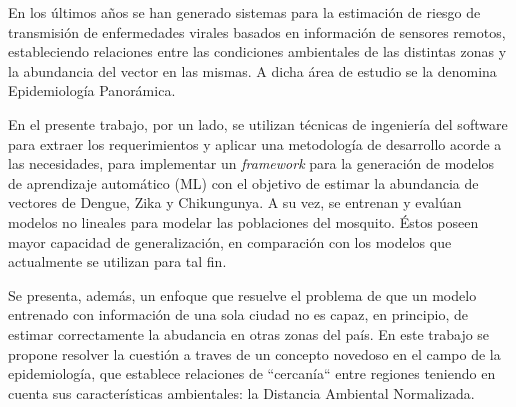   \par En los últimos años se han generado sistemas para la estimación de riesgo de transmisión
    de enfermedades virales basados en información de sensores remotos,
    estableciendo relaciones entre las condiciones ambientales de las distintas
    zonas y la abundancia del vector en las mismas. A dicha área de estudio
    se la denomina Epidemiología Panorámica.

 \par En el presente trabajo, por un lado, se utilizan técnicas de
    ingeniería del software para extraer los requerimientos y aplicar una metodología
    de desarrollo acorde a las necesidades,
    para implementar un \textit{framework} para la generación de modelos de
    aprendizaje automático (ML) con el objetivo
    de estimar la abundancia de vectores de Dengue, Zika y Chikungunya.
    A su vez, se entrenan y evalúan modelos no lineales para modelar las poblaciones del
    mosquito. Éstos poseen mayor
    capacidad de generalización, en comparación con los modelos que
    actualmente se utilizan para tal fin.

  \par Se presenta, además, un enfoque que resuelve el problema de que
    un modelo entrenado con información de una sola ciudad no es capaz,
    en principio, de estimar correctamente la abudancia en otras zonas del país.
    En este trabajo
    se propone resolver la cuestión a traves de un concepto novedoso en el campo
    de la epidemiología, que establece
    relaciones de ``cercanía``
    entre regiones teniendo en cuenta sus características
    ambientales: la Distancia Ambiental Normalizada.

